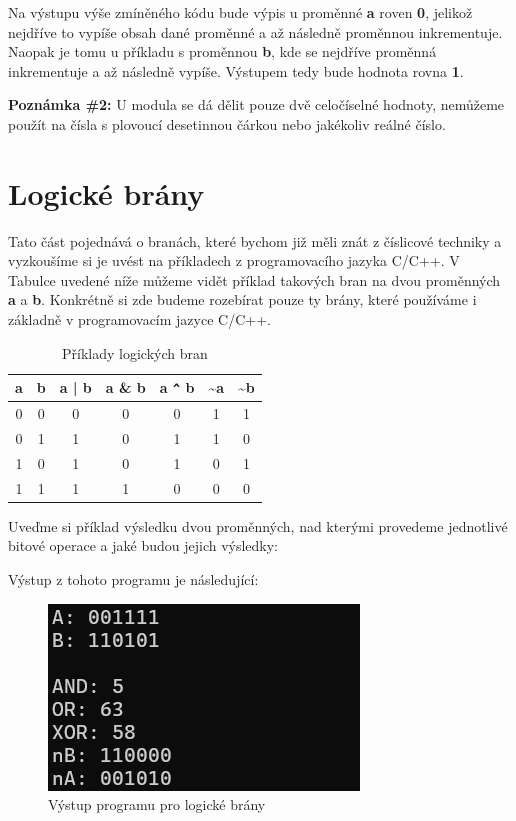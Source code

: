 \documentclass[twoside,a4paper]{article} %
\begin{document}


Na výstupu výše zmíněného kódu bude výpis u proměnné \textbf{a} roven \textbf{0}, jelikož nejdříve to vypíše obsah dané proměnné a až následně proměnnou inkrementuje. Naopak je tomu u příkladu s proměnnou \textbf{b}, kde se nejdříve proměnná inkrementuje a až následně vypíše. Výstupem tedy bude hodnota rovna \textbf{1}.

\textbf{Poznámka \#2:} U modula se dá dělit pouze dvě celočíselné hodnoty, nemůžeme použít na čísla s plovoucí desetinnou čárkou nebo jakékoliv reálné číslo.

\section{Logické brány}
Tato část pojednává o branách, které bychom již měli znát z číslicové techniky a vyzkoušíme si je uvést na příkladech z programovacího jazyka C/C++. V Tabulce uvedené níže můžeme vidět příklad takových bran na dvou proměnných \textbf{a} a \textbf{b}. Konkrétně si zde budeme rozebírat pouze ty brány, které používáme i základně v programovacím jazyce C/C++.


\begin{table}[H]
    \centering
    \begin{tabular}{|c|c||c|c|c|c|c|}
      \rowcolor{yellow}\hline  a & b & a | b & a \& b & a \texttt{\^{}} b & \textasciitilde a & \textasciitilde b\\
        \hline 0 & 0 & 0 &  0& 0 &  1&1 \\
         \hline 0 & 1 & 1 &  0& 1 & 1 &0 \\
         \hline 1&  0&  1&  0&  1& 0 & 1\\
         \hline 1&  1&  1& 1 &  0& 0 & 0\\ \hline
    \end{tabular}
    \caption{Příklady logických bran}
    \label{tab:logicGates}
\end{table}

Uveďme si příklad výsledku dvou proměnných, nad kterými provedeme jednotlivé bitové operace a jaké budou jejich výsledky:



Výstup z tohoto programu je následující:

\begin{figure}[H]
    \centering
    \includegraphics[width=0.4\linewidth]{logicGatesOutput.png}
    \caption{Výstup programu pro logické brány}
    \label{fig:placeholder}
\end{figure}
\end{document}
